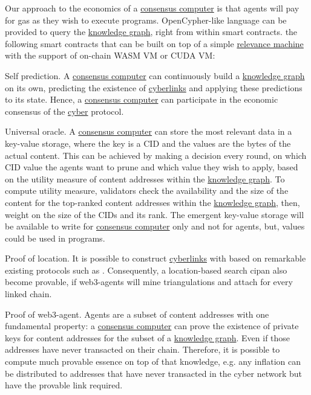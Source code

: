 \documentclass[8pt,oneside]{amsart}
\newcommand{\linkgreen}[2]{\href{#1}{\color{green}{#2}}}
\begin{document}
Our approach to the economics of a {\hyperref[consensus-computer]{consensus computer}} is that agents will pay for gas as they wish to execute programs. OpenCypher-like language can be provided to query the {\hyperref[knowledge-graph]{knowledge graph}}, right from within smart contracts. \linkgreen{https://medium.com/@karpathy/software-2-0-a64152b37c35}{We can envision} the following smart contracts that can be built on top of a simple {\hyperref[relevance-machine]{relevance machine}} with the support of on-chain WASM VM or CUDA VM:

Self prediction. A {\hyperref[consensus-computer]{consensus computer}} can continuously build a {\hyperref[knowledge-graph]{knowledge graph}} on its own, predicting the existence of {\hyperref[cyberlinks]{cyberlinks}} and applying these predictions to its state. Hence, a {\hyperref[consensus-computer]{consensus computer}} can participate in the economic consensus of the {\hyperref[cyber]{cyber}} protocol.

Universal oracle. A {\hyperref[consensus-computer]{consensus computer}} can store the most relevant data in a key-value storage, where the key is a CID and the values are the bytes of the actual content. This can be achieved by making a decision every round, on which CID value the agents want to prune and which value they wish to apply, based on the utility measure of content addresses within the {\hyperref[knowledge-graph]{knowledge graph}}. To compute utility measure, validators check the availability and the size of the content for the top-ranked content addresses within the {\hyperref[knowledge-graph]{knowledge graph}}, then, weight on the size of the CIDs and its rank. The emergent key-value storage will be available to write for {\hyperref[consensus-computer]{consensus computer}} only and not for agents, but, values could be used in programs.

Proof of location. It is possible to construct {\hyperref[cyberlinks]{cyberlinks}} with \linkgreen{https://ipfs.io/ipfs/QmZYKGuLHf2h1mZrhiP2FzYsjj3tWt2LYduMCRbpgi5pKG}{Proof-of-Location} based on remarkable existing protocols such as \linkgreen{https://ipfs.io/ipfs/QmZYKGuLHf2h1mZrhiP2FzYsjj3tWt2LYduMCRbpgi5pKG}{Foam}. Consequently, a location-based search cipan also become provable, if web3-agents will mine triangulations and attach \linkgreen{https://ipfs.io/ipfs/QmZYKGuLHf2h1mZrhiP2FzYsjj3tWt2LYduMCRbpgi5pKG}{proof-of-location} for every linked chain.

Proof of web3-agent. Agents are a subset of content addresses with one fundamental property: a {\hyperref[consensus-computer]{consensus computer}} can prove the existence of private keys for content addresses for the subset of a {\hyperref[knowledge-graph]{knowledge graph}}. Even if those addresses have never transacted on their chain. Therefore, it is possible to compute much provable essence on top of that knowledge, e.g. any inflation can be distributed to addresses that have never transacted in the cyber network but have the provable link required.
\end{document}
